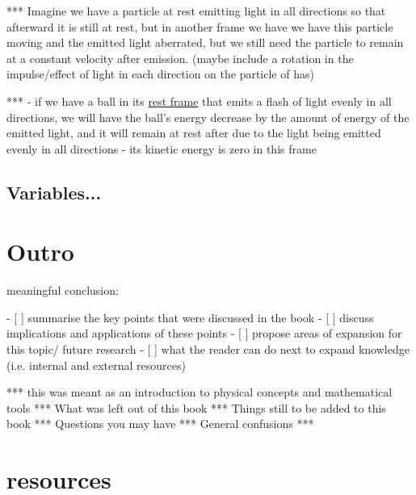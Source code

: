*** Imagine we have a particle at rest emitting light in all directions so that afterward it is still at rest, but in another frame we have we have this particle moving and the emitted light aberrated, but we still need the particle to remain at a constant velocity after emission. (maybe include a rotation in the impulse/effect of light in each direction on the particle of has)

*** - if we have a ball in its \hyperlink{def-proper-frame}{rest frame} that emits a flash of light evenly in all directions, we will have the ball's energy decrease by the amount of energy of the emitted light, and it will remain at rest after due to the light being emitted evenly in all directions
- its kinetic energy is zero in this frame

\section{Variables...}

\chapter{Outro}

meaningful conclusion:

- [ ] summarise the key points that were discussed in the book
- [ ] discuss implications and applications of these points
- [ ] propose areas of expansion for this topic/ future research
- [ ] what the reader can do next to expand knowledge (i.e. internal and external resources)

*** this was meant as an introduction to physical concepts and mathematical tools
*** What was left out of this book
*** Things still to be added to this book
*** Questions you may have
*** General confusions
***

\chapter{resources}




